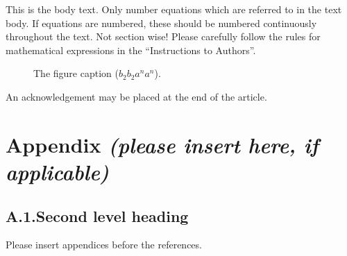 \documentclass[bimj,fleqn]{w-art}\usepackage[]{graphicx}\usepackage[]{color}
\theoremstyle{plain}
\theoremstyle{definition}
\begin{document}
  \noindent This is the body text. Only number equations which are referred to in the text body. If equations
  are numbered, these should be numbered continuously throughout the text. Not section wise! Please
  carefully follow the rules for mathematical expressions in the ``Instructions to Authors''.

  \begin{figure}[htb]
  \begin{center}
  \caption{The figure caption ($b_{2}b_{2}a^{n}a^{n}$).}
  \end{center}
  \end{figure}
  \begin{acknowledgement}
  An acknowledgement may be placed at the end of the article.
  \end{acknowledgement}
  \vspace*{1pc}



  \section*{Appendix {\it(please insert here, if applicable)}}

  \subsection*{A.1.\enspace Second level heading}

  Please insert appendices before the references.
\end{document}
